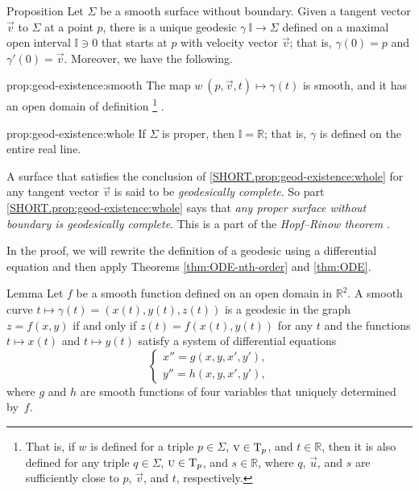 \begin{thm}{Proposition}\label{prop:geod-existence} 
Let $\Sigma$ be a smooth surface without boundary.
Given a tangent vector ${\vec v}$ to $\Sigma$ at a point $p$,
there is a unique geodesic $\gamma\:\mathbb{I}\to \Sigma$ defined on a maximal open interval $\mathbb{I}\ni 0$ that starts at $p$ with velocity vector ${\vec v}$;
that is, $\gamma(0)=p$ and $\gamma'(0)={\vec v}$.
Moreover, we have the following.
\begin{subthm}{prop:geod-existence:smooth}
The map $w\:(p,{\vec v},t)\mapsto \gamma(t)$ is smooth, and it has an open domain of definition%
\footnote{That is, if $w$ is defined for a triple $p\in \Sigma$, ${\text{\sc{v}}}\in \mathrm{T}_p$, and $t\in \mathbb{R}$,
then it is also defined for any triple $q\in \Sigma$, $\text{\sc{u}}\in \mathrm{T}_p$, and $s\in \mathbb{R}$, where $q$, $\vec u$, and $s$ are sufficiently close to $p$, ${\vec v}$, and $t$, respectively.}%
.
\end{subthm}

\begin{subthm}{prop:geod-existence:whole}
If $\Sigma$ is proper, then $\mathbb{I}=\mathbb{R}$; that is, $\gamma$ is defined on the entire real line.
\end{subthm}

\end{thm}

A surface that satisfies the conclusion of \ref{SHORT.prop:geod-existence:whole} for any tangent vector ${\vec v}$ is said to be \emph{geodesically complete}.
So part \ref{SHORT.prop:geod-existence:whole} says that \textit{any proper surface without boundary is geodesically complete}.
This is a part of the \emph{Hopf--Rinow theorem} \cite{hopf-rinow}.

In the proof, we will rewrite the definition of a geodesic using a differential equation and then apply Theorems \ref{thm:ODE-nth-order} and \ref{thm:ODE}.

\begin{thm}{Lemma}\label{lem:geodesic=2nd-order}
Let $f$ be a smooth function defined on an open domain in $\mathbb{R}^2$.
A smooth curve $t\mapsto \gamma(t)=(x(t),y(t),z(t))$ is a geodesic in the graph $z=f(x,y)$ if and only if $z(t)=f(x(t),y(t))$ for any $t$ and the functions $t\mapsto x(t)$ and $t\mapsto y(t)$
satisfy a system of differential equations
\[
\begin{cases}
x''=g(x,y,x',y'),
\\
y''=h(x,y,x',y'),
\end{cases}
\]
where $g$ and $h$ are smooth functions of four variables that uniquely determined by~$f$.
\end{thm}

